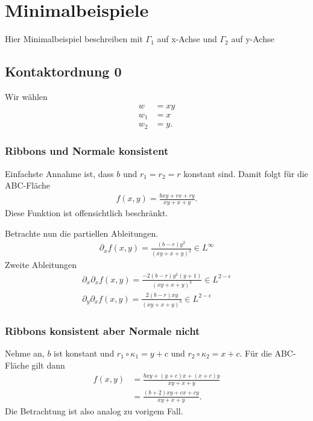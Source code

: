 \documentclass[10pt,a4paper]{report}
\begin{document}
\chapter{Minimalbeispiele}
Hier Minimalbeispiel beschreiben mit $\Gamma_1$ auf x-Achse und $\Gamma_2$ auf y-Achse
\section{Kontaktordnung 0}
Wir wählen
\begin{align*}
w &= xy \\
w_1 &= x \\
w_2 &= y.
\end{align*}
\subsection{Ribbons und Normale konsistent}
Einfachste Annahme ist, dass $b$ und $r_1 = r_2 = r$ konstant sind.
Damit folgt für die ABC-Fläche
\begin{align*}
f \left(x, y\right) = \frac{bxy + rx + ry}{xy+x+y}.
\end{align*}
Diese Funktion ist offensichtlich beschränkt.

Betrachte nun die partiellen Ableitungen.
\begin{align*}
\partial_x f \left(x, y\right) = \frac{\left(b-r\right) y^2}{\left( xy+x+y\right)^2} \in L^{\infty}
\end{align*}
Zweite Ableitungen
\begin{align*}
\partial_x \partial_x f \left(x, y\right) = \frac{-2 \left(b-r\right) y^2 (y+1)}{\left( xy+x+y\right)^3} \in L^{2-\epsilon} \\
\partial_y \partial_x f \left(x, y\right) = \frac{2 \left(b-r\right) xy}{\left( xy+x+y\right)^3} \in L^{2-\epsilon}
\end{align*}

\subsection{Ribbons konsistent aber Normale nicht}
Nehme an, $b$ ist konstant und $r_1 \circ \kappa_1 = y+c$ und $r_2 \circ \kappa_2 = x+c$.
Für die ABC-Fläche gilt dann
\begin{align*}
f \left(x, y\right) &= \frac{bxy + \left(y+c\right)x + \left(x+c\right)y}{xy+x+y} \\
&= \frac{\left(b+2\right)xy + cx + cy}{xy+x+y}.
\end{align*}
Die Betrachtung ist also analog zu vorigem Fall.
\end{document}
